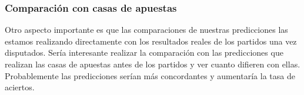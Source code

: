 \subsubsection*{Comparación con casas de apuestas}
Otro aspecto importante es que las comparaciones de nuestras predicciones las estamos realizando directamente con los resultados reales de los partidos una vez disputados. Sería interesante realizar la comparación con las predicciones que realizan las casas de apuestas antes de los partidos y ver cuanto difieren con ellas. Probablemente las predicciones serían más concordantes y aumentaría la tasa de aciertos.
 
